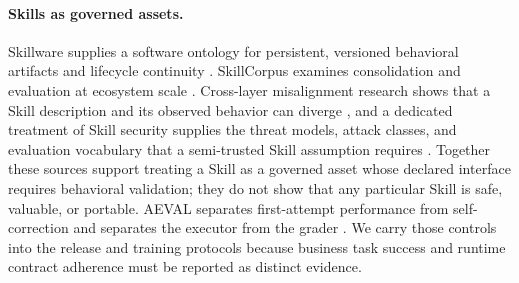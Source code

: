 \documentclass[11pt]{article}
\begin{document}
\paragraph{Skills as governed assets.}
Skillware supplies a software ontology for persistent, versioned behavioral artifacts and lifecycle continuity \cite{fan2026skillware}. SkillCorpus examines consolidation and evaluation at ecosystem scale \cite{wang2026skillcorpus}. Cross-layer misalignment research shows that a Skill description and its observed behavior can diverge \cite{zhang2026misalignment}, and a dedicated treatment of Skill security supplies the threat models, attack classes, and evaluation vocabulary that a semi-trusted Skill assumption requires \cite{badhe2026skillsecurity}. Together these sources support treating a Skill as a governed asset whose declared interface requires behavioral validation; they do not show that any particular Skill is safe, valuable, or portable. AEVAL separates first-attempt performance from self-correction and separates the executor from the grader \cite{anand2026aeval}. We carry those controls into the release and training protocols because business task success and runtime contract adherence must be reported as distinct evidence.
\end{document}
